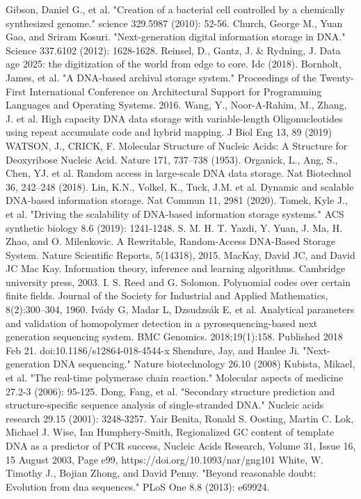 \documentclass[a4paper,conference]{IEEEtran}
\begin{document}
\begin{thebibliography}{1}
Gibson, Daniel G., et al. "Creation of a bacterial cell controlled by a chemically synthesized genome." science 329.5987 (2010): 52-56.
Church, George M., Yuan Gao, and Sriram Kosuri. "Next-generation digital information storage in DNA." Science 337.6102 (2012): 1628-1628.
Reinsel, D., Gantz, J. & Rydning, J. Data age 2025: the digitization of the world from edge to core. Idc (2018).
Bornholt, James, et al. "A DNA-based archival storage system." Proceedings of the Twenty-First International Conference on Architectural Support for Programming Languages and Operating Systems. 2016.
Wang, Y., Noor-A-Rahim, M., Zhang, J. et al. High capacity DNA data storage with variable-length Oligonucleotides using repeat accumulate code and hybrid mapping. J Biol Eng 13, 89 (2019)
WATSON, J., CRICK, F. Molecular Structure of Nucleic Acids: A Structure for Deoxyribose Nucleic Acid. Nature 171, 737–738 (1953).
Organick, L., Ang, S., Chen, YJ. et al. Random access in large-scale DNA data storage. Nat Biotechnol 36, 242–248 (2018).
Lin, K.N., Volkel, K., Tuck, J.M. et al. Dynamic and scalable DNA-based information storage. Nat Commun 11, 2981 (2020).
Tomek, Kyle J., et al. "Driving the scalability of DNA-based information storage systems." ACS synthetic biology 8.6 (2019): 1241-1248.
S. M. H. T. Yazdi, Y. Yuan, J. Ma, H. Zhao, and O. Milenkovic. A Rewritable, Random-Access DNA-Based Storage System. Nature Scientific Reports, 5(14318), 2015.
MacKay, David JC, and David JC Mac Kay. Information theory, inference and learning algorithms. Cambridge university press, 2003.
I. S. Reed and G. Solomon. Polynomial codes over certain finite fields. Journal of the Society for Industrial and Applied Mathematics, 8(2):300–304, 1960.
Ivády G, Madar L, Dzsudzsák E, et al. Analytical parameters and validation of homopolymer detection in a pyrosequencing-based next generation sequencing system. BMC Genomics. 2018;19(1):158. Published 2018 Feb 21. doi:10.1186/s12864-018-4544-x
Shendure, Jay, and Hanlee Ji. "Next-generation DNA sequencing." Nature biotechnology 26.10 (2008)
Kubista, Mikael, et al. "The real-time polymerase chain reaction." Molecular aspects of medicine 27.2-3 (2006): 95-125.
Dong, Fang, et al. "Secondary structure prediction and structure-specific sequence analysis of single-stranded DNA." Nucleic acids research 29.15 (2001): 3248-3257.
Yair Benita, Ronald S. Oosting, Martin C. Lok, Michael J. Wise, Ian Humphery‐Smith, Regionalized GC content of template DNA as a predictor of PCR success, Nucleic Acids Research, Volume 31, Issue 16, 15 August 2003, Page e99, https://doi.org/10.1093/nar/gng101
White, W. Timothy J., Bojian Zhong, and David Penny. "Beyond reasonable doubt: Evolution from dna sequences." PLoS One 8.8 (2013): e69924.
\end{thebibliography}




\end{document}
